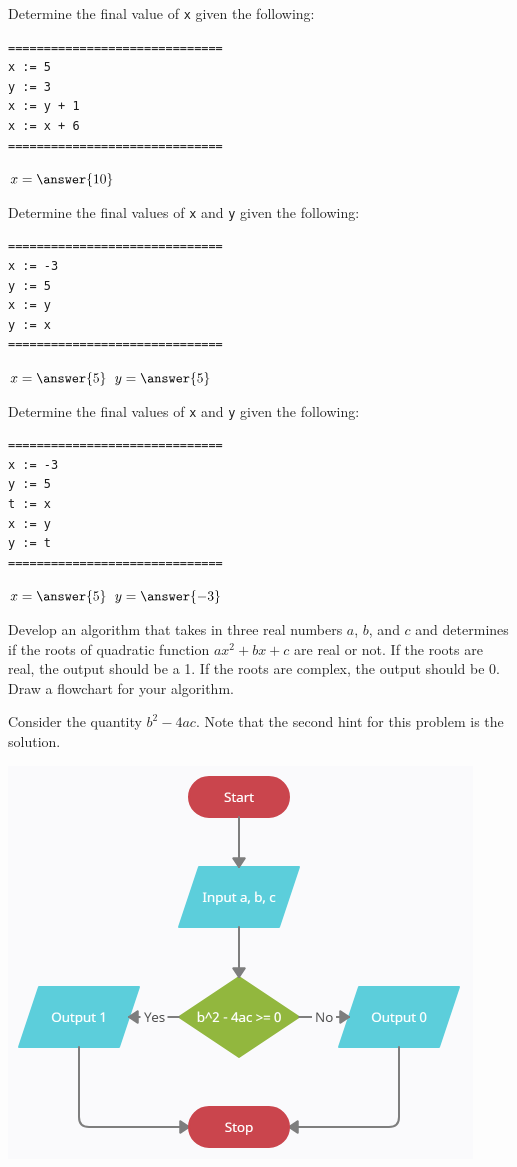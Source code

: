 \documentclass{ximera}
\begin{document}
\begin{question}
	Determine the final value of \verb|x| given the following:
	\begin{verbatim}
==============================
x := 5
y := 3
x := y + 1
x := x + 6
==============================
	\end{verbatim}   
	$x = \answer{10}$
\end{question}

\begin{question}
	Determine the final values of \verb|x| and \verb|y| given the following:
	\begin{verbatim}
==============================
x := -3
y := 5
x := y
y := x
==============================
	\end{verbatim}
	$x = \answer{5}$
	$y = \answer{5}$
\end{question}

\begin{question}
	Determine the final values of \verb|x| and \verb|y| given the following:
	\begin{verbatim}
==============================
x := -3
y := 5
t := x
x := y
y := t
==============================
	\end{verbatim}
	$x = \answer{5}$
	$y = \answer{-3}$
\end{question}

\begin{question}
	Develop an algorithm that takes in three real numbers $a$, $b$, and $c$ and determines if the roots of quadratic function $ax^2+bx+c$ are real or not. If the roots are real, the output should be a 1. If the roots are complex, the output should be 0. Draw a flowchart for your algorithm.
	\begin{hint}
		Consider the quantity $b^2-4ac$. Note that the second hint for this problem is the solution.
	\end{hint}
	
	\begin{hint}
		\begin{center}
		\includegraphics{realornot.png}
		\end{center}
	\end{hint}
\end{question}
\end{document}
